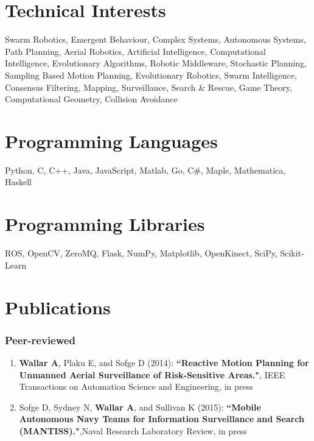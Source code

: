 \documentclass[line,margin]{cv}
\begin{document}
\begin{resume}
\begin{itemize}
\end{itemize}

\section{Technical Interests}
    Swarm Robotics, Emergent Behaviour, Complex Systems, Autonomous
    Systems, Path Planning, Aerial Robotics, Artificial Intelligence,
    Computational Intelligence, Evolutionary Algorithms, Robotic Middleware,
    Stochastic Planning, Sampling Based Motion Planning, Evolutionary Robotics,
    Swarm Intelligence, Consensus Filtering, Mapping, Surveillance, Search \&
    Rescue, Game Theory, Computational Geometry, Collision Avoidance

\section{Programming Languages}
    Python, C, C++, Java, JavaScript, Matlab, Go, C\#, Maple,
    Mathematica, Haskell \\

\section{Programming Libraries}
    ROS, OpenCV, ZeroMQ, Flask, NumPy, Matplotlib, OpenKinect, SciPy,
    Scikit-Learn\\

\section{Publications}

\subsubsection{Peer-reviewed}

\begin{enumerate}

    \item \textbf{Wallar A}, Plaku E, and Sofge D (2014):
        \textbf{``Reactive Motion Planning for Unmanned Aerial Surveillance
        of Risk-Sensitive Areas."}, IEEE Transactions on Automation Science
        and Engineering, in press

    \item Sofge D, Sydney N, \textbf{Wallar A}, and Sullivan K (2015):
        \textbf{``Mobile Autonomous Navy Teams for Information Surveillance
        and Search (MANTISS)."},Naval Research Laboratory Review, in press


\end{enumerate}
\end{resume}
\end{document}
